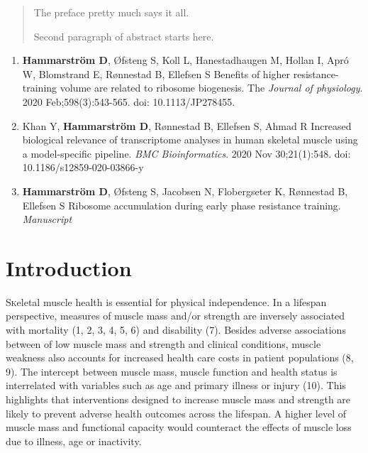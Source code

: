 \documentclass[twoside,10pt]{gihclass} %
\def\labelenumi{\Roman{enumi}.}
\begin{document}
  \begin{abstract}
    The preface pretty much says it all.

    \par

    Second paragraph of abstract starts here.
  \end{abstract}
  \begin{listofpapers}
    \begin{enumerate}
    \def\labelenumi{\Roman{enumi}.}
    \item
      \textbf{Hammarström D}, Øfsteng S, Koll L, Hanestadhaugen M, Hollan I, Apró W, Blomstrand E, Rønnestad B, Ellefsen S Benefits of higher resistance-training volume are related to ribosome biogenesis. The \emph{Journal of physiology}. 2020 Feb;598(3):543-565. doi: 10.1113/JP278455.
    \item
      Khan Y, \textbf{Hammarström D}, Rønnestad B, Ellefsen S, Ahmad R Increased biological relevance of transcriptome analyses in human skeletal muscle using a model-specific pipeline. \emph{BMC Bioinformatics}. 2020 Nov 30;21(1):548. doi: 10.1186/s12859-020-03866-y
    \item
      \textbf{Hammarström D}, Øfsteng S, Jacobsen N, Flobergseter K, Rønnestad B, Ellefsen S Ribosome accumulation during early phase resistance training. \emph{Manuscript}
    \end{enumerate}
  \end{listofpapers}

  \hypersetup{linkcolor=black}
  \setcounter{tocdepth}{2}
  \tableofcontents

  \listoftables

  \listoffigures




\mainmatter %
\pagestyle{fancyplain} %

\setcounter{DefaultLines}{3}

\hypertarget{introduction}{%
\chapter{Introduction}\label{introduction}}

\lettrine{S}keletal muscle health is essential for physical independence. In a lifespan perspective, measures of muscle mass and/or strength are inversely associated with mortality
(1, 2, 3, 4, 5, 6)
and disability
(7).
Besides adverse associations between of low muscle mass and strength and clinical conditions, muscle weakness also accounts for increased health care costs in patient populations
(8, 9).
The intercept between muscle mass, muscle function and health status is interrelated with variables such as age and primary illness or injury
(10).
This highlights that interventions designed to increase muscle mass and strength are likely to prevent adverse health outcomes across the lifespan. A higher level of muscle mass and functional capacity would counteract the effects of muscle loss due to illness, age or inactivity.
\end{document}
